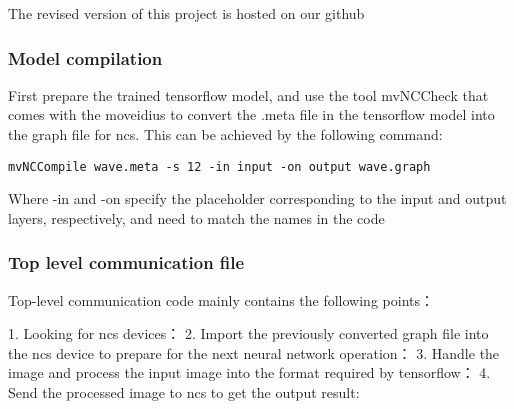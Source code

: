 The revised version of this project is hosted on our github\cite{my-nerual-style-tensorflow}
\subsubsection{Model compilation}
First prepare the trained tensorflow model, and use the tool mvNCCheck that comes with the moveidius to convert the .meta file in the tensorflow model into the graph file for ncs.
This can be achieved by the following command:
\begin{lstlisting}
mvNCCompile wave.meta -s 12 -in input -on output wave.graph
\end{lstlisting}
Where -in and -on specify the placeholder corresponding to the input and output layers, respectively, and need to match the names in the code
\subsubsection{Top level communication file}
 Top-level communication code mainly contains the following points：

1. Looking for ncs devices：
2. Import the previously converted graph file into the ncs device to prepare for the next neural network operation：
3. Handle the image and process the input image into the format required by tensorflow：
4. Send the processed image to ncs to get the output result:
